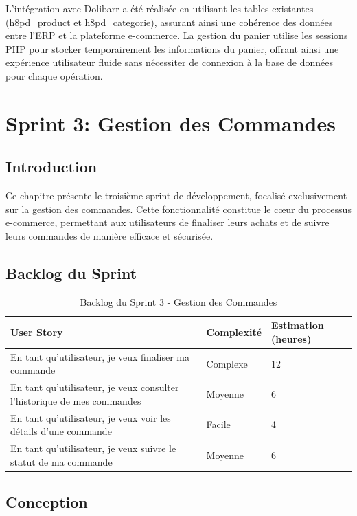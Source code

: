 \documentclass[12pt,a4paper]{report}
\begin{document}
L'intégration avec Dolibarr a été réalisée en utilisant les tables existantes (h8pd\_product et h8pd\_categorie), assurant ainsi une cohérence des données entre l'ERP et la plateforme e-commerce. La gestion du panier utilise les sessions PHP pour stocker temporairement les informations du panier, offrant ainsi une expérience utilisateur fluide sans nécessiter de connexion à la base de données pour chaque opération.

\chapter{Sprint 3: Gestion des Commandes}
\section{Introduction}
Ce chapitre présente le troisième sprint de développement, focalisé exclusivement sur la gestion des commandes. Cette fonctionnalité constitue le cœur du processus e-commerce, permettant aux utilisateurs de finaliser leurs achats et de suivre leurs commandes de manière efficace et sécurisée.

\section{Backlog du Sprint}

\begin{table}[H]
\centering
\begin{tabularx}{\textwidth}{|X|X|X|}
\hline
\textbf{User Story} & \textbf{Complexité} & \textbf{Estimation (heures)} \\
\hline
En tant qu'utilisateur, je veux finaliser ma commande & Complexe & 12 \\
\hline
En tant qu'utilisateur, je veux consulter l'historique de mes commandes & Moyenne & 6 \\
\hline
En tant qu'utilisateur, je veux voir les détails d'une commande & Facile & 4 \\
\hline
En tant qu'utilisateur, je veux suivre le statut de ma commande & Moyenne & 6 \\

\hline
\end{tabularx}
\caption{Backlog du Sprint 3 - Gestion des Commandes}
\label{tab:backlog_sprint3}
\end{table}

\section{Conception}
\end{document}
